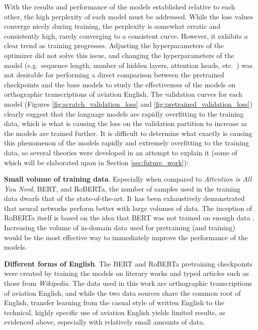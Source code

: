 \documentclass[12pt]{article}
\begin{document}
With the results and performance of the models established relative to each other, the high perplexity of each model must be addressed. While the loss
values converge nicely during training, the perplexity is somewhat erratic and consistently high, rarely converging to a consistent curve. However, it
exhibits a clear trend as training progresses. Adjusting the hyperparameters of the optimizer did not solve this issue, and changing the
hyperparameters of the model (e.g.~sequence length, number of hidden layers, attention heads, etc.~) was not desirable for performing a direct
comparison between the pretrained checkpoints and the base models to study the effectiveness of the models on orthographic transcriptions of aviation
English. The validation curves for each model (Figures \ref{fig:scratch_validation_loss} and \ref{fig:pretrained_validation_loss}) clearly suggest
that the language models are rapidly overfitting to the training data, which is what is causing the loss on the validation partition to increase as
the models are trained further. It is difficult to determine what exactly is causing this phenomenon of the models rapidly and extremely overfitting
to the training data, so several theories were developed in an attempt to explain it (some of which will be elaborated upon in Section
\ref{sec:future_work}):

\textbf{Small volume of training data}. Especially when compared to \textit{Attention is All You Need}, BERT, and RoBERTa,
\cite{vaswani_attention_2017,devlin_bert_2019,liu_roberta_2019} the number of samples used in the training data dwarfs that of the state-of-the-art.
It has been exhaustively demonstrated that neural networks perform better with large volumes of data. The inception of RoBERTa itself is based on the
idea that BERT was not trained on enough data \cite{liu_roberta_2019}. Increasing the volume of in-domain data used for pretraining (and training)
would be the most effective way to immediately improve the performance of the models.

\textbf{Different forms of English}. The BERT and RoBERTa pretraining checkpoints were created by training the models on literary works and typed
articles such as those from \textit{Wikipedia}. The data used in this work are orthographic transcriptions of aviation English, and while the two data
sources share the common root of English, transfer learning from the casual style of written English to the technical, highly specific use of aviation
English yields limited results, as evidenced above, especially with relatively small amounts of data.
\end{document}
